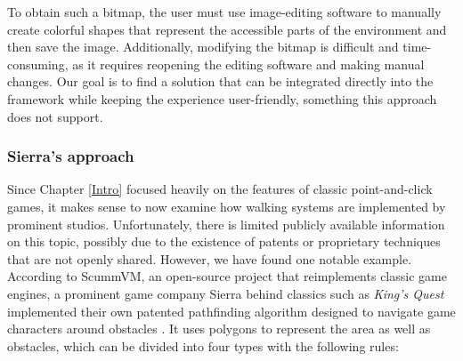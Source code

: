 To obtain such a bitmap, the user must use image-editing software to manually create colorful shapes that represent the accessible parts of the environment and then save the image. Additionally, modifying the bitmap is difficult and time-consuming, as it requires reopening the editing software and making manual changes. Our goal is to find a solution that can be integrated directly into the framework while keeping the experience user-friendly, something this approach does not support. 

\subsubsection{Sierra's approach}
Since Chapter \ref{Intro} focused heavily on the features of classic point-and-click games, it makes sense to now examine how walking systems are implemented by prominent studios. Unfortunately, there is limited publicly available information on this topic, possibly due to the existence of patents or proprietary techniques that are not openly shared. However, we have found one notable example. According to ScummVM, an open-source project that reimplements classic game engines, a prominent game company Sierra behind classics such as \textit{King's Quest} implemented their own patented pathfinding algorithm designed to navigate game characters around obstacles \cite{ScummVM-polygons}. It uses polygons to represent the area as well as obstacles, which can be divided into four types with the following rules:

